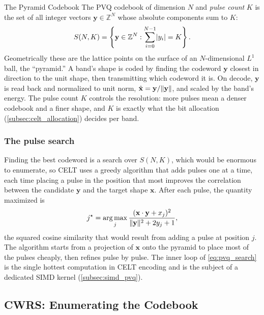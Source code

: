 \begin{concept}{The Pyramid Codebook}
  The PVQ codebook of dimension $N$ and \emph{pulse count} $K$ is the set of all
  integer vectors $\mathbf{y} \in \mathbb{Z}^N$ whose absolute components sum to
  $K$:
  \begin{equation}\label{eq:pvq_codebook}
    S(N, K) = \left\{\mathbf{y} \in \mathbb{Z}^N :
    \sum_{i=0}^{N-1} \lvert y_i\rvert = K\right\}.
  \end{equation}
  Geometrically these are the lattice points on the surface of an
  $N$-dimensional
  $L^1$ ball, the ``pyramid.'' A band's shape is coded by finding the codeword
  $\mathbf{y}$ closest in direction to the unit shape, then transmitting which
  codeword it is. On decode, $\mathbf{y}$ is read back and normalized to unit
  norm, $\hat{\mathbf{x}} = \mathbf{y}/\lVert\mathbf{y}\rVert$, and scaled by the
  band's energy. The pulse count $K$ controls the resolution: more pulses mean a
  denser codebook and a finer shape, and $K$ is exactly what the bit allocation
  (\cref{subsec:celt_allocation}) decides per band.
\end{concept}

\subsubsection{The pulse search}

Finding the best codeword is a search over $S(N,K)$, which would be enormous to
enumerate, so CELT uses a greedy algorithm that adds pulses one at a time, each
time placing a pulse in the position that most improves the correlation between
the candidate $\mathbf{y}$ and the target shape $\mathbf{x}$. After each pulse,
the quantity maximized is
\begin{equation}\label{eq:pvq_search}
  j^\star = \operatorname*{arg\,max}_j \frac{(\mathbf{x}\cdot\mathbf{y} + x_j)^2}
  {\lVert\mathbf{y}\rVert^2 + 2y_j + 1},
\end{equation}
the squared cosine similarity that would result from adding a pulse at position
$j$. The algorithm starts from a projection of $\mathbf{x}$ onto the pyramid to
place most of the pulses cheaply, then refines pulse by pulse. The inner loop of
\cref{eq:pvq_search} is the single hottest computation in CELT encoding and is
the subject of a dedicated SIMD kernel (\cref{subsec:simd_pvq}).

\subsection{CWRS: Enumerating the Codebook}\label{subsec:cwrs}

